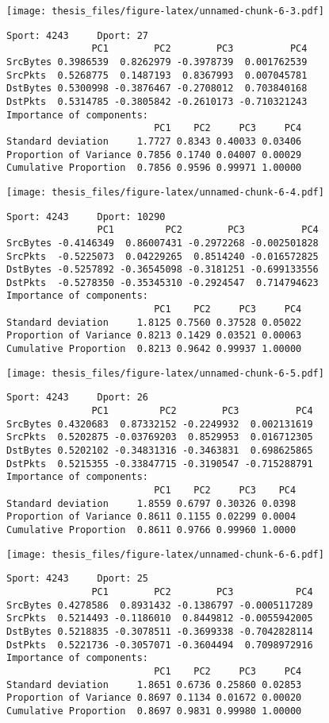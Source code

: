 \documentclass[12pt,twoside]{dukestatscithesis}
\theoremstyle{definition}
\theoremstyle{definition}
\theoremstyle{definition}
\theoremstyle{remark}
\begin{document}
\texttt{[image: thesis\_files/figure-latex/unnamed-chunk-6-3.pdf]}
\begin{verbatim}
Sport: 4243     Dport: 27 
               PC1        PC2        PC3          PC4
SrcBytes 0.3986539  0.8262979 -0.3978739  0.001762539
SrcPkts  0.5268775  0.1487193  0.8367993  0.007045781
DstBytes 0.5300998 -0.3876467 -0.2708012  0.703840168
DstPkts  0.5314785 -0.3805842 -0.2610173 -0.710321243
Importance of components:
                          PC1    PC2     PC3     PC4
Standard deviation     1.7727 0.8343 0.40033 0.03406
Proportion of Variance 0.7856 0.1740 0.04007 0.00029
Cumulative Proportion  0.7856 0.9596 0.99971 1.00000
\end{verbatim}
\texttt{[image: thesis\_files/figure-latex/unnamed-chunk-6-4.pdf]}
\begin{verbatim}
Sport: 4243     Dport: 10290 
                PC1         PC2        PC3          PC4
SrcBytes -0.4146349  0.86007431 -0.2972268 -0.002501828
SrcPkts  -0.5225073  0.04229265  0.8514240 -0.016572825
DstBytes -0.5257892 -0.36545098 -0.3181251 -0.699133556
DstPkts  -0.5278350 -0.35345310 -0.2924547  0.714794623
Importance of components:
                          PC1    PC2     PC3     PC4
Standard deviation     1.8125 0.7560 0.37528 0.05022
Proportion of Variance 0.8213 0.1429 0.03521 0.00063
Cumulative Proportion  0.8213 0.9642 0.99937 1.00000
\end{verbatim}
\texttt{[image: thesis\_files/figure-latex/unnamed-chunk-6-5.pdf]}
\begin{verbatim}
Sport: 4243     Dport: 26 
               PC1         PC2        PC3          PC4
SrcBytes 0.4320683  0.87332152 -0.2249932  0.002131619
SrcPkts  0.5202875 -0.03769203  0.8529953  0.016712305
DstBytes 0.5202102 -0.34831316 -0.3463831  0.698625865
DstPkts  0.5215355 -0.33847715 -0.3190547 -0.715288791
Importance of components:
                          PC1    PC2     PC3    PC4
Standard deviation     1.8559 0.6797 0.30326 0.0398
Proportion of Variance 0.8611 0.1155 0.02299 0.0004
Cumulative Proportion  0.8611 0.9766 0.99960 1.0000
\end{verbatim}
\texttt{[image: thesis\_files/figure-latex/unnamed-chunk-6-6.pdf]}
\begin{verbatim}
Sport: 4243     Dport: 25 
               PC1        PC2        PC3           PC4
SrcBytes 0.4278586  0.8931432 -0.1386797 -0.0005117289
SrcPkts  0.5214493 -0.1186010  0.8449812 -0.0055942005
DstBytes 0.5218835 -0.3078511 -0.3699338 -0.7042828114
DstPkts  0.5221736 -0.3057071 -0.3604494  0.7098972916
Importance of components:
                          PC1    PC2     PC3     PC4
Standard deviation     1.8651 0.6736 0.25860 0.02853
Proportion of Variance 0.8697 0.1134 0.01672 0.00020
Cumulative Proportion  0.8697 0.9831 0.99980 1.00000
\end{verbatim}
\end{document}
